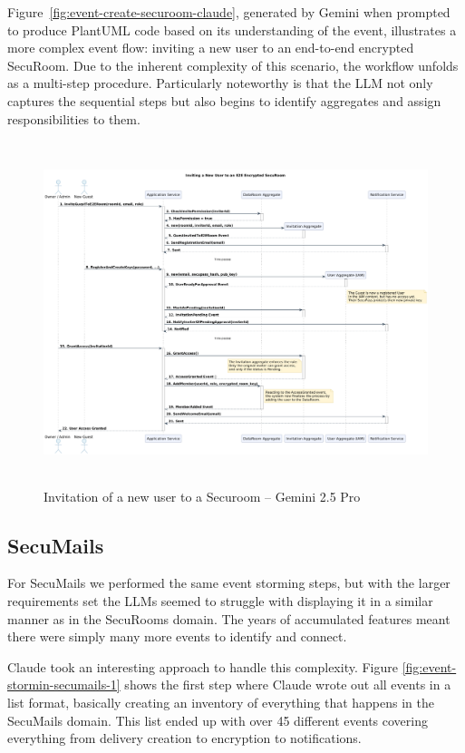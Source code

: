   Figure~\ref{fig:event-create-securoom-claude}, generated by Gemini when prompted to produce PlantUML code based on its understanding of the event, illustrates a more complex event flow: inviting a new user to an end-to-end encrypted SecuRoom. Due to the inherent complexity of this scenario, the workflow unfolds as a multi-step procedure. Particularly noteworthy is that the LLM not only captures the sequential steps but also begins to identify aggregates and assign responsibilities to them.


  \begin{figure}[H]
    \centering
    \begin{adjustbox}{max width=\textwidth}
        \includegraphics[height=10cm]{figures/invitaion-new-user-gemini.png} 
    \end{adjustbox}
    \caption{Invitation of a new user to a Securoom – Gemini 2.5 Pro}
    \label{fig:event-invite-new-user-gemini} 
\end{figure}

  \subsection{SecuMails}

  For SecuMails we performed the same event storming steps, but with the larger requirements set the LLMs seemed to struggle with displaying it in a similar manner as in the SecuRooms domain. The years of accumulated features meant there were simply many more events to identify and connect.
  
  Claude took an interesting approach to handle this complexity. Figure \ref{fig:event-stormin-secumails-1} shows the first step where Claude wrote out all events in a list format, basically creating an inventory of everything that happens in the SecuMails domain. This list ended up with over 45 different events covering everything from delivery creation to encryption to notifications.
  
